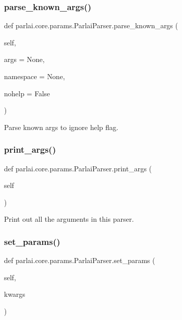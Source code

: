 \subsubsection{\texorpdfstring{parse\+\_\+known\+\_\+args()}{parse\_known\_args()}}
{\footnotesize\ttfamily def parlai.\+core.\+params.\+Parlai\+Parser.\+parse\+\_\+known\+\_\+args (\begin{DoxyParamCaption}\item[{}]{self,  }\item[{}]{args = {\ttfamily None},  }\item[{}]{namespace = {\ttfamily None},  }\item[{}]{nohelp = {\ttfamily False} }\end{DoxyParamCaption})}

\begin{DoxyVerb}Parse known args to ignore help flag.
\end{DoxyVerb}
 \mbox{\label{classparlai_1_1core_1_1params_1_1ParlaiParser_adb1dec3d3433b40209bb2c24722df335}} 
\subsubsection{\texorpdfstring{print\+\_\+args()}{print\_args()}}
{\footnotesize\ttfamily def parlai.\+core.\+params.\+Parlai\+Parser.\+print\+\_\+args (\begin{DoxyParamCaption}\item[{}]{self }\end{DoxyParamCaption})}

\begin{DoxyVerb}Print out all the arguments in this parser.
\end{DoxyVerb}
 \mbox{\label{classparlai_1_1core_1_1params_1_1ParlaiParser_a6f1dc42e86af57a7fc4ef9a4c68ca247}} 
\subsubsection{\texorpdfstring{set\+\_\+params()}{set\_params()}}
{\footnotesize\ttfamily def parlai.\+core.\+params.\+Parlai\+Parser.\+set\+\_\+params (\begin{DoxyParamCaption}\item[{}]{self,  }\item[{}]{kwargs }\end{DoxyParamCaption})}

